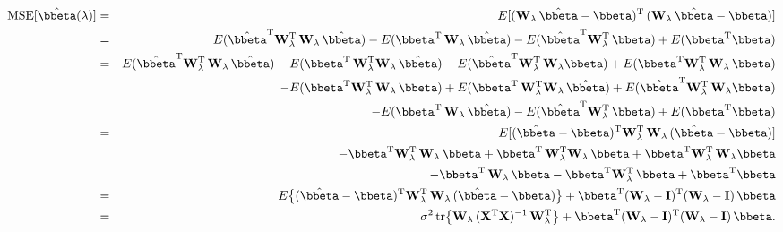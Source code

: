 \documentclass[a4paper]{article}
\theoremstyle{myexamplestyle}
\begin{document}
\begin{eqnarray*}
\mbox{MSE}[\hat{\bbeta}(\lambda)] & = & E [ (\mathbf{W}_{\lambda} \, \hat{\bbeta} - \bbeta)^{\mathrm{T}} \, (\mathbf{W}_{\lambda} \, \hat{\bbeta} - \bbeta) ]
\\
& = & E ( \hat{\bbeta}^{\mathrm{T}} \mathbf{W}_{\lambda}^{\mathrm{T}} \,\mathbf{W}_{\lambda} \, \hat{\bbeta} ) - E ( \bbeta^{\mathrm{T}}  \, \mathbf{W}_{\lambda} \, \hat{\bbeta}) - E ( \hat{\bbeta}^{\mathrm{T}} \mathbf{W}_{\lambda}^{\mathrm{T}} \, \bbeta) + E ( \bbeta^{\mathrm{T}} \bbeta) 
\\
& = & E ( \hat{\bbeta}^{\mathrm{T}} \mathbf{W}_{\lambda}^{\mathrm{T}} \,\mathbf{W}_{\lambda} \, \hat{\bbeta} ) - E ( \bbeta^{\mathrm{T}} \, \mathbf{W}_{\lambda}^{\mathrm{T}} \mathbf{W}_{\lambda} \, \hat{\bbeta})
- E ( \hat{\bbeta}^{\mathrm{T}} \mathbf{W}_{\lambda}^{\mathrm{T}} \, \mathbf{W}_{\lambda} \bbeta) + E ( \bbeta^{\mathrm{T}} \mathbf{W}_{\lambda}^{\mathrm{T}} \,\mathbf{W}_{\lambda} \, \bbeta )
\\
& & - E ( \bbeta^{\mathrm{T}} \mathbf{W}_{\lambda}^{\mathrm{T}} \,\mathbf{W}_{\lambda} \, \bbeta ) + E ( \bbeta^{\mathrm{T}} \, \mathbf{W}_{\lambda}^{\mathrm{T}} \mathbf{W}_{\lambda} \, \hat{\bbeta})
+ E ( \hat{\bbeta}^{\mathrm{T}} \mathbf{W}_{\lambda}^{\mathrm{T}} \, \mathbf{W}_{\lambda} \bbeta)
\\
& &  - E ( \bbeta^{\mathrm{T}}  \, \mathbf{W}_{\lambda} \, \hat{\bbeta}) - E ( \hat{\bbeta}^{\mathrm{T}} \mathbf{W}_{\lambda}^{\mathrm{T}} \, \bbeta) + E ( \bbeta^{\mathrm{T}} \bbeta)
\\
& = & E [ ( \hat{\bbeta} - \bbeta )^{\mathrm{T}} \mathbf{W}_{\lambda}^{\mathrm{T}} \, \mathbf{W}_{\lambda} \, (\hat{\bbeta} - \bbeta) ]
\\
& & - \bbeta^{\mathrm{T}} \mathbf{W}_{\lambda}^{\mathrm{T}} \,\mathbf{W}_{\lambda} \, \bbeta  + \bbeta^{\mathrm{T}} \, \mathbf{W}_{\lambda}^{\mathrm{T}} \mathbf{W}_{\lambda} \, \bbeta
+ \bbeta^{\mathrm{T}} \mathbf{W}_{\lambda}^{\mathrm{T}} \, \mathbf{W}_{\lambda} \bbeta
\\
& &  - \bbeta^{\mathrm{T}}  \, \mathbf{W}_{\lambda} \, \bbeta -  \bbeta^{\mathrm{T}} \mathbf{W}_{\lambda}^{\mathrm{T}} \, \bbeta + \bbeta^{\mathrm{T}} \bbeta 
\\
& = & E \big\{ ( \hat{\bbeta} - \bbeta )^{\mathrm{T}} \mathbf{W}_{\lambda}^{\mathrm{T}} \, \mathbf{W}_{\lambda} \, (\hat{\bbeta} - \bbeta) \big\} +  \bbeta^{\mathrm{T}} (\mathbf{W}_{\lambda} - \mathbf{I})^{\mathrm{T}} (\mathbf{W}_{\lambda} - \mathbf{I}) \, \bbeta
\\
& = & \sigma^2 \, \mbox{tr}\big\{ \mathbf{W}_{\lambda} \, (\mathbf{X}^{\mathrm{T}} \mathbf{X})^{-1} \, \mathbf{W}_{\lambda}^{\mathrm{T}} \big\} + \bbeta^{\mathrm{T}} (\mathbf{W}_{\lambda} - \mathbf{I})^{\mathrm{T}} (\mathbf{W}_{\lambda} - \mathbf{I}) \, \bbeta.
\end{eqnarray*}
\end{document}
